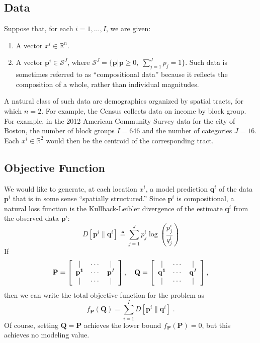 \documentclass[english]{scrartcl}
\newcommand\R[0]{\mathbb{R}}
\begin{document}
	\subsection{Data}
	Suppose that, for each $i = 1,\ldots,I$, we are given:
	\begin{enumerate}
		\item A vector $x^i\in \R^n$.
		\item A vector $\mathbf{p}^i \in \mathcal{S}^J$, where $\mathcal{S}^J = \{\mathbf{p} | \mathbf{p} \geq 0,\; \sum_{j = 1}^J p_j = 1\}$. Such data is sometimes referred to as ``compositional data'' because it reflects the composition of a whole, rather than individual magnitudes. 
	\end{enumerate}
	A natural class of such data are demographics organized by spatial tracts, for which $n = 2$. For example, the Census collects data on income by block group. For example, in the 2012 American Community Survey data for the city of Boston, the number of block groups $I = 646$ and the number of categories $J = 16$. Each $x^i \in \R^2$ would then be the centroid of the corresponding tract. 

	\subsection{Objective Function}
	We would like to generate, at each location $x^i$, a model prediction $\mathbf{q}^i$ of the data $\mathbf{p}^i$ that is in some sense ``spatially structured.'' Since $\mathbf{p}^i$ is compositional, a natural loss function is the Kullback-Leibler divergence of the estimate $\mathbf{q}^i$ from the observed data $\mathbf{p}^i$: 
	\begin{equation}
		D[\mathbf{p}^i\|\mathbf{q}^i] \triangleq \sum_{j=1}^J p^i_j \log \left(\frac{p^i_j}{q^i_j} \right)
	\end{equation}
	If 
	\begin{equation}
		\mathbf{P} = \left[\begin{array}{c c c}
			| & \cdots & | \\
			\mathbf{p^1} & \cdots & \mathbf{p}^I \\
			| & \cdots & | 
		\end{array}\right],
		\quad 
		\mathbf{Q} = \left[\begin{array}{c c c}
			| & \cdots & | \\
			\mathbf{q^1} & \cdots & \mathbf{q}^I \\
			| & \cdots & | 
		\end{array}\right],
	\end{equation}
	then we can write the total objective function for the problem as 
	\begin{equation}
		f_\mathbf{P}(\mathbf{Q}) = \sum_{i = 1}^I D[\mathbf{p}^i \| \mathbf{q}^i]\;.
	\end{equation}
	Of course, setting $\mathbf{Q} = \mathbf{P}$ achieves the lower bound $f_\mathbf{P}(\mathbf{P}) = 0$, but this achieves no modeling value. 
\end{document}
